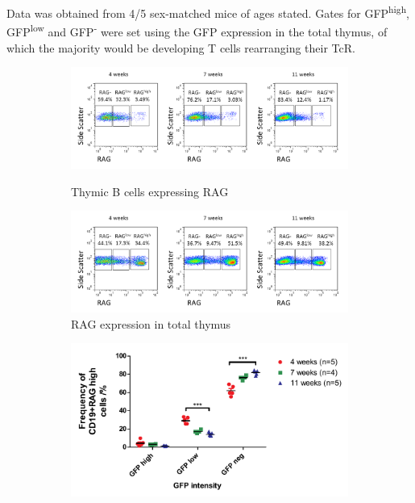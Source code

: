 Data was obtained from 4/5 sex-matched mice of ages stated.
Gates for GFP\textsuperscript{high}, GFP\textsuperscript{low} and GFP\textsuperscript{-} were set using the GFP expression in the total thymus, of which the majority would be developing T cells rearranging their TcR.



\begin{figure}
	\begin{subfigure}{\textwidth}
	\includegraphics[width=\textwidth]{Figures/RAGhighlownegthyB.png}
	\caption{Thymic B cells expressing RAG}
	\label{subfig:RAGhighlownegthyB}
	\includegraphics[width=\textwidth]{Figures/RAGhighlownegtotalthy.png}
	\caption{RAG expression in total thymus}
		\label{subfig:RAGhighlownegtotthy}
	\end{subfigure}
	\begin{subfigure}{\textwidth}
	\includegraphics[width=\textwidth]{Figures/RAGhighlownegative.pdf}

\end{subfigure}
\end{figure}
